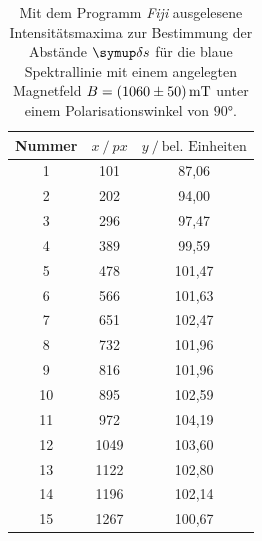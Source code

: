 \begin{table}[H]
  \centering
  \caption{Mit dem Programm \textit{Fiji} \cite{Fiji} ausgelesene Intensitätsmaxima zur Bestimmung der Abstände $\deltaup s$ für die blaue Spektrallinie mit einem angelegten Magnetfeld $B=\SI{1060 \pm 50}{\milli\tesla}$ unter einem Polarisationswinkel von $90°$.}
  \label{tab:piblau1060mT}
  \begin{tabular}{c|cc}
    \toprule
    {Nummer} & {$x \:/\: \si{px}$} & {$y \:/\: \text{bel. Einheiten}$}\\
    \midrule
 1 &  101  &	 87,06 \\
 2 &  202  &	 94,00 \\
 3 &  296  &	 97,47 \\
 4 &  389  &	 99,59 \\
 5 &  478  &	 101,47 \\
 6 &  566  &	 101,63 \\
 7 &  651  &	 102,47 \\
 8 &  732  &	 101,96\\
 9 &  816  &   101,96 \\
10 &  895  &	 102,59 \\
11 &  972  &	 104,19 \\
12 &  1049 &	 103,60 \\
13 &  1122 &	 102,80 \\
14 &  1196 &	 102,14 \\
15 &  1267 &	 100,67 \\
  \end{tabular}
\end{table}

